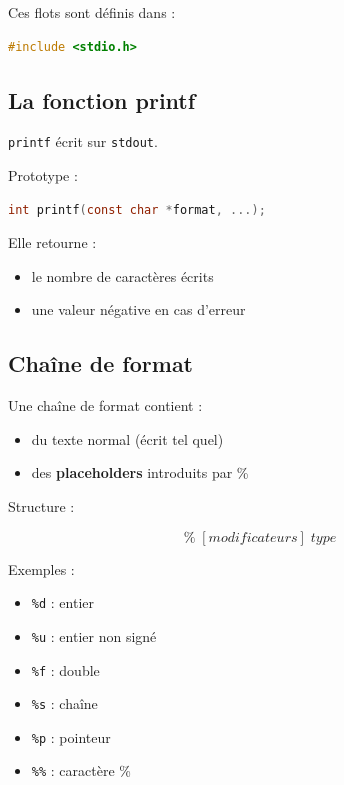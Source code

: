 Ces flots sont définis dans :

\begin{lstlisting}[language=C]
#include <stdio.h>
\end{lstlisting}

\subsection{La fonction printf}

\texttt{printf} écrit sur \texttt{stdout}.

Prototype :

\begin{lstlisting}[language=C]
int printf(const char *format, ...);
\end{lstlisting}

Elle retourne :

\begin{itemize}
    \item le nombre de caractères écrits
    \item une valeur négative en cas d’erreur
\end{itemize}

\subsection{Chaîne de format}

Une chaîne de format contient :

\begin{itemize}
    \item du texte normal (écrit tel quel)
    \item des \textbf{placeholders} introduits par \%
\end{itemize}

Structure :

\[
\% \; [modificateurs] \; type
\]

Exemples :

\begin{itemize}
    \item \texttt{\%d} : entier
    \item \texttt{\%u} : entier non signé
    \item \texttt{\%f} : double
    \item \texttt{\%s} : chaîne
    \item \texttt{\%p} : pointeur
    \item \texttt{\%\%} : caractère \%
\end{itemize}

